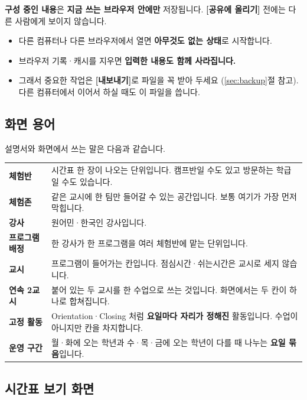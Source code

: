 \documentclass[11pt,a4paper]{article}
\newcommand{\btn}[1]{\textcolor{ttdark}{\sffamily\bfseries[#1]}}   %
\begin{document}
\begin{danger}
\textbf{구성 중인 내용}은 \textbf{지금 쓰는 브라우저 안에만} 저장됩니다. \btn{공유에 올리기} 전에는 다른 사람에게 보이지 않습니다.
\begin{itemize}
  \item 다른 컴퓨터나 다른 브라우저에서 열면 \textbf{아무것도 없는 상태}로 시작합니다.
  \item 브라우저 기록·캐시를 지우면 \textbf{입력한 내용도 함께 사라집니다.}
  \item 그래서 중요한 작업은 \btn{내보내기}로 파일을 꼭 받아 두세요
        (\ref{sec:backup}절 참고). 다른 컴퓨터에서 이어서 하실 때도 이 파일을 씁니다.
\end{itemize}
\end{danger}

\subsection{화면 용어}

설명서와 화면에서 쓰는 말은 다음과 같습니다.

\begin{center}
\begin{tabularx}{\linewidth}{@{}>{\sffamily\bfseries\color{ttdark}}l X@{}}
\toprule
체험반 & 시간표 한 장이 나오는 단위입니다. 캠프반일 수도 있고 방문하는 학급일 수도 있습니다. \\
체험존 & 같은 교시에 한 팀만 들어갈 수 있는 공간입니다. 보통 여기가 가장 먼저 막힙니다. \\
강사 & 원어민·한국인 강사입니다. \\
프로그램 배정 & 한 강사가 한 프로그램을 여러 체험반에 맡는 단위입니다. \\
교시 & 프로그램이 들어가는 칸입니다. 점심시간·쉬는시간은 교시로 세지 않습니다. \\
연속 2교시 & 붙어 있는 두 교시를 한 수업으로 쓰는 것입니다. 화면에서는 두 칸이 하나로 합쳐집니다. \\
\textbf{고정 활동} & Orientation·Closing 처럼 \textbf{요일마다 자리가 정해진} 활동입니다. 수업이 아니지만 칸을 차지합니다. \\
\textbf{운영 구간} & 월·화에 오는 학년과 수·목·금에 오는 학년이 다를 때 나누는 \textbf{요일 묶음}입니다. \\
\bottomrule
\end{tabularx}
\end{center}

\subsection{시간표 보기 화면}
\end{document}
